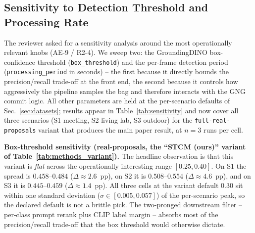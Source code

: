 \subsection{Sensitivity to Detection Threshold and Processing Rate}
\label{sec:sensitivity}

The reviewer asked for a sensitivity analysis around the most
operationally relevant knobs (AE-9 / R2-4). We sweep two: the
GroundingDINO box-confidence threshold (\texttt{box\_threshold}) and
the per-frame detection period (\texttt{processing\_period} in
seconds) -- the first because it directly bounds the
precision/recall trade-off at the front end, the second because it
controls how aggressively the pipeline samples the bag and therefore
interacts with the GNG commit logic. All other parameters are held
at the per-scenario defaults of Sec.~\ref{sec:datasets}; results
appear in Table~\ref{tab:sensitivity} and now cover all three
scenarios (S1 meeting, S2 living lab, S3 outdoor) for the
\texttt{full-real-proposals} variant that produces the main paper
result, at $n{=}3$ runs per cell.

\noindent\textbf{Box-threshold sensitivity (real-proposals, the
``STCM (ours)'' variant of Table~\ref{tab:methods_variant}).}
The headline observation is that this variant is \emph{flat} across
the operationally interesting range $[0.25, 0.40]$. On S1 the spread
is $0.458$--$0.484$ ($\Delta \approx 2.6$~pp), on S2 it is
$0.508$--$0.554$ ($\Delta \approx 4.6$~pp), and on S3 it is
$0.445$--$0.459$ ($\Delta \approx 1.4$~pp). All three cells at the
variant default $0.30$ sit within one standard deviation
($\sigma \in [0.005, 0.057]$) of the per-scenario peak, so the
declared default is not a brittle pick. The two-pronged downstream
filter -- per-class prompt rerank plus CLIP label margin -- absorbs
most of the precision/recall trade-off that the box threshold would
otherwise dictate.

